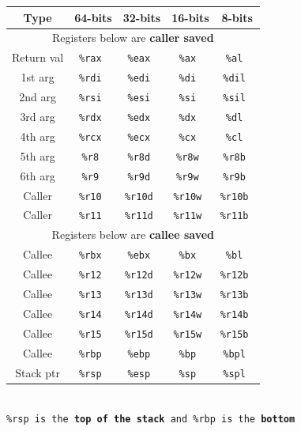 \begin{center}
    \begin{tabular}{| c || c | c | c | c |}
        \hline
        \textbf{Type} & \textbf{64-bits} & \textbf{32-bits} & \textbf{16-bits} & \textbf{8-bits} \\ \hline
        \multicolumn{5}{|c|}{Registers below are \textbf{caller saved}} \\ \hline
        Return val & \tt{\%rax}  & \tt{\%eax}  & \tt{\%ax}  & \tt{\%al} \\ \hline
        1st arg & \tt{\%rdi}  & \tt{\%edi}  & \tt{\%di}  & \tt{\%dil} \\ \hline
        2nd arg & \tt{\%rsi}  & \tt{\%esi}  & \tt{\%si}  & \tt{\%sil} \\ \hline
        3rd arg & \tt{\%rdx}  & \tt{\%edx}  & \tt{\%dx}  & \tt{\%dl} \\ \hline
        4th arg & \tt{\%rcx}  & \tt{\%ecx}  & \tt{\%cx}  & \tt{\%cl} \\ \hline
        5th arg & \tt{\%r8}  & \tt{\%r8d}  & \tt{\%r8w}  & \tt{\%r8b} \\ \hline
        6th arg & \tt{\%r9}  & \tt{\%r9d}  & \tt{\%r9w}  & \tt{\%r9b} \\ \hline
        Caller & \tt{\%r10}  & \tt{\%r10d}  & \tt{\%r10w}  & \tt{\%r10b} \\ \hline
        Caller & \tt{\%r11}  & \tt{\%r11d}  & \tt{\%r11w}  & \tt{\%r11b} \\ \hline
        \multicolumn{5}{|c|}{Registers below are \textbf{callee saved}} \\ \hline
        Callee & \tt{\%rbx}  & \tt{\%ebx}  & \tt{\%bx}  & \tt{\%bl} \\ \hline
        Callee & \tt{\%r12}  & \tt{\%r12d}  & \tt{\%r12w}  & \tt{\%r12b} \\ \hline
        Callee & \tt{\%r13}  & \tt{\%r13d}  & \tt{\%r13w}  & \tt{\%r13b} \\ \hline
        Callee & \tt{\%r14}  & \tt{\%r14d}  & \tt{\%r14w}  & \tt{\%r14b} \\ \hline
        Callee & \tt{\%r15}  & \tt{\%r15d}  & \tt{\%r15w}  & \tt{\%r15b} \\ \hline
        Callee & \tt{\%rbp}  & \tt{\%ebp}  & \tt{\%bp}  & \tt{\%bpl} \\ \hline
        Stack ptr & \tt{\%rsp}  & \tt{\%esp}  & \tt{\%sp}  & \tt{\%spl} \\ \hline
    \end{tabular}\\
    
    \tt{\%rsp} is the \textbf{top of the stack} and \tt{\%rbp} is the \textbf{bottom} 
\end{center}


